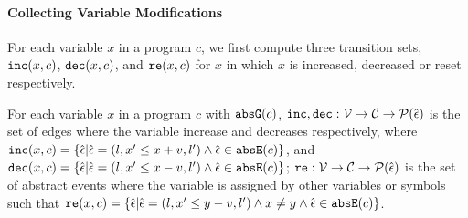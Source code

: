 \paragraph{Collecting Variable Modifications}
 For each variable $x$ in a program $c$, we first compute three transition sets, $\mathtt{inc}(x, c)$, $\mathtt{dec}(x, c)$,
 and $\mathtt{re}(x, c)$ for $x$
 in which $x$ is increased,
 decreased
 or reset
 respectively.
 \begin{defn}
 \label{def:var_modi}
 For each variable $x$ in a program $c$ with $\mathtt{abs}{\mathtt{G}}(c)$,
 $\mathtt{inc}, \mathtt{dec} : \mathcal{V} \to \mathcal{C} \to \mathcal{P}(\hat{\mathtt{\epsilon}{}}) $
 is the set of edges where the variable increase and decreases respectively, 
 where $\inc(x, c) = \left\{ \absevent | \absevent = (l, x' \leq x + v, l') \land \absevent \in \absE(c) \right\}$,
 and $\dec(x, c) = \left\{\absevent| \absevent = (l, x' \leq x - v, l') \land \absevent \in \absE(c) \right\}$;
 $\mathtt{re}: \mathcal{V} \to \mathcal{C} \to \mathcal{P}(\hat{\mathtt{\epsilon}{}}) $ is the set of abstract events where the variable is assigned by other variables or symbols such that
 $\reset(x, c) = \left\{ \absevent| \absevent = (l, x' \leq y - v, l') \land x \neq y \land \absevent \in \absE(c) \right\}$. 
 \end{defn}
